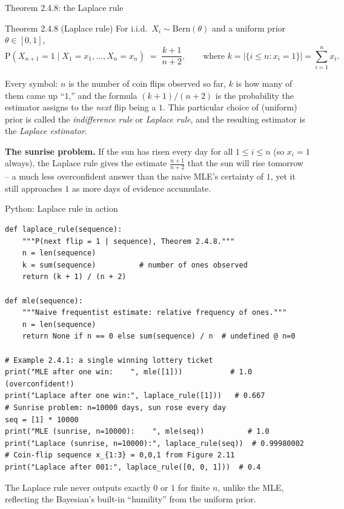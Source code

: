 \documentclass[aspectratio=169,10pt]{beamer}
\begin{document}
\begin{frame}{Theorem 2.4.8: the Laplace rule}
  \begin{block}{Theorem 2.4.8 (Laplace rule)}
    For i.i.d.\ $X_i\sim\mathrm{Bern}(\theta)$ and a uniform prior
    $\theta\in[0,1]$,
    \[
      \mathrm P(X_{n+1}=1\mid X_1=x_1,\ldots,X_n=x_n) \;=\; \frac{k+1}{n+2},
      \qquad \text{where } k=\bigl|\{i\le n: x_i=1\}\bigr|=\sum_{i=1}^n x_i.
    \]
  \end{block}
  Every symbol: $n$ is the number of coin flips observed so far, $k$ is how
  many of them came up ``$1$,'' and the formula $(k+1)/(n+2)$ is the
  probability the estimator assigns to the \emph{next} flip being a $1$.
  This particular choice of (uniform) prior is called the \emph{indifference
  rule} or \emph{Laplace rule}, and the resulting estimator is the
  \emph{Laplace estimator}.

  \textbf{The sunrise problem.} If the sun has risen every day for all
  $1\le i\le n$ (so $x_i=1$ always), the Laplace rule gives the estimate
  $\frac{n+1}{n+2}$ that the sun will rise tomorrow -- a much less
  overconfident answer than the naive MLE's certainty of $1$, yet it still
  approaches $1$ as more days of evidence accumulate.
\end{frame}

\begin{frame}[fragile]{Python: Laplace rule in action}
  \begin{lstlisting}
def laplace_rule(sequence):
    """P(next flip = 1 | sequence), Theorem 2.4.8."""
    n = len(sequence)
    k = sum(sequence)          # number of ones observed
    return (k + 1) / (n + 2)

def mle(sequence):
    """Naive frequentist estimate: relative frequency of ones."""
    n = len(sequence)
    return None if n == 0 else sum(sequence) / n  # undefined @ n=0

# Example 2.4.1: a single winning lottery ticket
print("MLE after one win:    ", mle([1]))           # 1.0  (overconfident!)
print("Laplace after one win:", laplace_rule([1]))   # 0.667
# Sunrise problem: n=10000 days, sun rose every day
seq = [1] * 10000
print("MLE (sunrise, n=10000):    ", mle(seq))          # 1.0
print("Laplace (sunrise, n=10000):", laplace_rule(seq))  # 0.99980002
# Coin-flip sequence x_{1:3} = 0,0,1 from Figure 2.11
print("Laplace after 001:", laplace_rule([0, 0, 1]))  # 0.4
  \end{lstlisting}
  The Laplace rule never outputs exactly $0$ or $1$ for finite $n$, unlike
  the MLE, reflecting the Bayesian's built-in ``humility'' from the uniform
  prior.
\end{frame}
\end{document}
